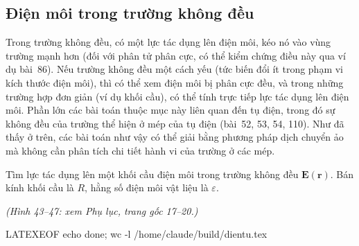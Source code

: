 \subsection{Điện môi trong trường không đều}

Trong trường không đều, có một lực tác dụng lên điện môi, kéo nó vào vùng trường mạnh hơn (đối với phân tử phân cực, có thể kiểm chứng điều này qua ví dụ bài~86). Nếu trường không đều một cách yếu (tức biến đổi ít trong phạm vi kích thước điện môi), thì có thể xem điện môi bị phân cực đều, và trong những trường hợp đơn giản (ví dụ khối cầu), có thể tính trực tiếp lực tác dụng lên điện môi. Phần lớn các bài toán thuộc mục này liên quan đến tụ điện, trong đó sự không đều của trường thể hiện ở mép của tụ điện (bài~52, 53, 54, 110). Như đã thấy ở trên, các bài toán như vậy có thể giải bằng phương pháp dịch chuyển ảo mà không cần phân tích chi tiết hành vi của trường ở các mép.

 Tìm lực tác dụng lên một khối cầu điện môi trong trường không đều $\mathbf{E}(\mathbf{r})$. Bán kính khối cầu là $R$, hằng số điện môi vật liệu là $\varepsilon$. 


\emph{(Hình 43--47: xem Phụ lục, trang gốc 17--20.)}

LATEXEOF
echo done; wc -l /home/claude/build/dientu.tex
